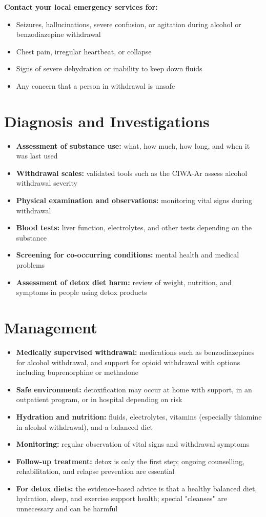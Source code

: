 \textbf{Contact your local emergency services for:}
\begin{itemize}
    \item Seizures, hallucinations, severe confusion, or agitation during alcohol or benzodiazepine withdrawal
    \item Chest pain, irregular heartbeat, or collapse
    \item Signs of severe dehydration or inability to keep down fluids
    \item Any concern that a person in withdrawal is unsafe
\end{itemize}

\section*{Diagnosis and Investigations}
\begin{itemize}
    \item \textbf{Assessment of substance use:} what, how much, how long, and when it was last used
    \item \textbf{Withdrawal scales:} validated tools such as the CIWA-Ar assess alcohol withdrawal severity
    \item \textbf{Physical examination and observations:} monitoring vital signs during withdrawal
    \item \textbf{Blood tests:} liver function, electrolytes, and other tests depending on the substance
    \item \textbf{Screening for co-occurring conditions:} mental health and medical problems
    \item \textbf{Assessment of detox diet harm:} review of weight, nutrition, and symptoms in people using detox products
\end{itemize}

\section*{Management}
\begin{itemize}
    \item \textbf{Medically supervised withdrawal:} medications such as benzodiazepines for alcohol withdrawal, and support for opioid withdrawal with options including buprenorphine or methadone
    \item \textbf{Safe environment:} detoxification may occur at home with support, in an outpatient program, or in hospital depending on risk
    \item \textbf{Hydration and nutrition:} fluids, electrolytes, vitamins (especially thiamine in alcohol withdrawal), and a balanced diet
    \item \textbf{Monitoring:} regular observation of vital signs and withdrawal symptoms
    \item \textbf{Follow-up treatment:} detox is only the first step; ongoing counselling, rehabilitation, and relapse prevention are essential
    \item \textbf{For detox diets:} the evidence-based advice is that a healthy balanced diet, hydration, sleep, and exercise support health; special "cleanses" are unnecessary and can be harmful
\end{itemize}

